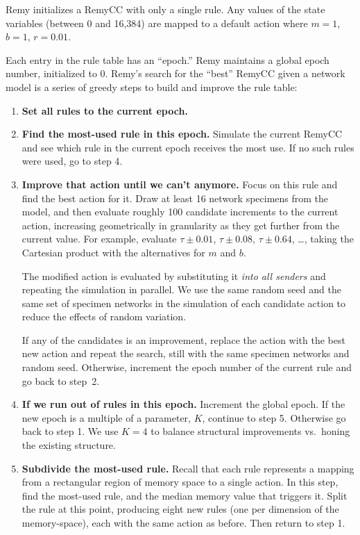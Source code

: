
Remy initializes a RemyCC with only a single rule. Any values of the
state variables (between 0 and 16,384) are mapped to a default action
where $m = 1$, $b = 1$, $r = 0.01$.

Each entry in the rule table has an ``epoch.''
Remy maintains a global epoch number, initialized to 0. Remy's search
for the ``best'' RemyCC given a network model is a series of greedy
steps to build and improve the rule table:

\begin{enumerate}

\item\textbf{Set all rules to the current epoch.} 

\item \textbf{Find the most-used rule in this epoch.} Simulate the
  current RemyCC and see which rule in the current epoch
  receives the most use.  If no such rules were used, go
  to step 4.

\item \textbf{Improve that action until we can't anymore.} Focus on
  this rule and find the best action for it. Draw at least 16 network
  specimens from the model, and then evaluate roughly 100 candidate
  increments to the current action, increasing geometrically in
  granularity as they get further from the current value. For example,
  evaluate $\tau \pm 0.01$, $\tau \pm 0.08$, $\tau \pm 0.64$, \ldots, taking
  the Cartesian product with the alternatives for $m$ and $b$.

  The modified action is evaluated by substituting it \emph{into all
    senders} and repeating the simulation in parallel. We use the same
  random seed and the same set of specimen networks in the simulation of
  each candidate action to reduce the effects of random variation.

  If any of the candidates is an improvement, replace the action with
  the best new action and repeat the search, still with the same
  specimen networks and random seed. Otherwise, increment the epoch
  number of the current rule and go back to step~2.

\item \textbf{If we run out of rules in this epoch.} Increment the
  global epoch. If the new epoch is a multiple of a parameter, $K$,
  continue to step 5. Otherwise go back to step 1. We use $K = 4$ to
  balance structural improvements vs.~honing the existing structure.

\item \textbf{Subdivide the most-used rule.} Recall that each rule
  represents a mapping from a rectangular region of memory space to a
  single action. In this step, find the most-used rule, and the median
  memory value that triggers it. Split the rule at this point,
  producing eight new rules (one per dimension of the memory-space),
  each with the same action as before. Then return to step 1.

\end{enumerate}

